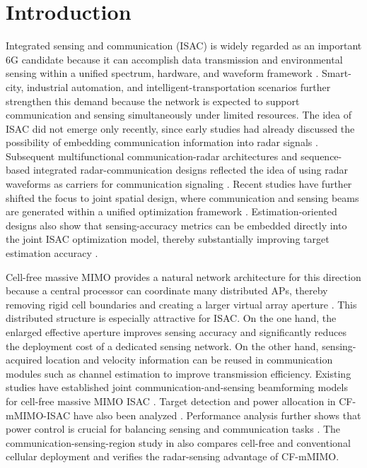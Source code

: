 \documentclass[conference,twocolumn,a4paper]{IEEEtran}
\begin{document}
\section{Introduction}
Integrated sensing and communication (ISAC) is widely regarded as an important 6G candidate because it can accomplish data transmission and environmental sensing within a unified spectrum, hardware, and waveform framework \cite{wei2022multifunctional}. Smart-city, industrial automation, and intelligent-transportation scenarios further strengthen this demand because the network is expected to support communication and sensing simultaneously under limited resources. The idea of ISAC did not emerge only recently, since early studies had already discussed the possibility of embedding communication information into radar signals \cite{mealey1963}. Subsequent multifunctional communication-radar architectures and sequence-based integrated radar-communication designs reflected the idea of using radar waveforms as carriers for communication signaling \cite{saddik2007,jamil2008}. Recent studies have further shifted the focus to joint spatial design, where communication and sensing beams are generated within a unified optimization framework \cite{liu2020joint}. Estimation-oriented designs also show that sensing-accuracy metrics can be embedded directly into the joint ISAC optimization model, thereby substantially improving target estimation accuracy \cite{liu2022crb}.

Cell-free massive MIMO provides a natural network architecture for this direction because a central processor can coordinate many distributed APs, thereby removing rigid cell boundaries and creating a larger virtual array aperture \cite{ngo2017cellfree}. This distributed structure is especially attractive for ISAC. On the one hand, the enlarged effective aperture improves sensing accuracy and significantly reduces the deployment cost of a dedicated sensing network. On the other hand, sensing-acquired location and velocity information can be reused in communication modules such as channel estimation to improve transmission efficiency. Existing studies have established joint communication-and-sensing beamforming models for cell-free massive MIMO ISAC \cite{demirhan2024cellfreetcom}. Target detection and power allocation in CF-mMIMO-ISAC have also been analyzed \cite{behdad2024multistatic}. Performance analysis further shows that power control is crucial for balancing sensing and communication tasks \cite{nguyen2024multistaticcf}. The communication-sensing-region study in \cite{mao2024region} also compares cell-free and conventional cellular deployment and verifies the radar-sensing advantage of CF-mMIMO.
\end{document}
